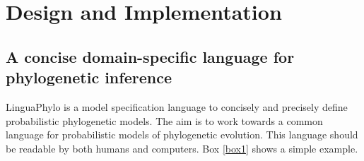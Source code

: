 \documentclass[10pt,letterpaper,table]{article}
\begin{document}



\section*{Design and Implementation}

\subsection*{A concise domain-specific language for phylogenetic inference}

LinguaPhylo is a model specification language to concisely and
precisely define probabilistic phylogenetic models.
The aim is to work
towards a common language for probabilistic models of phylogenetic
evolution.
This language should be readable by both humans and
computers.
Box \ref{box1} shows a simple example.
\end{document}
